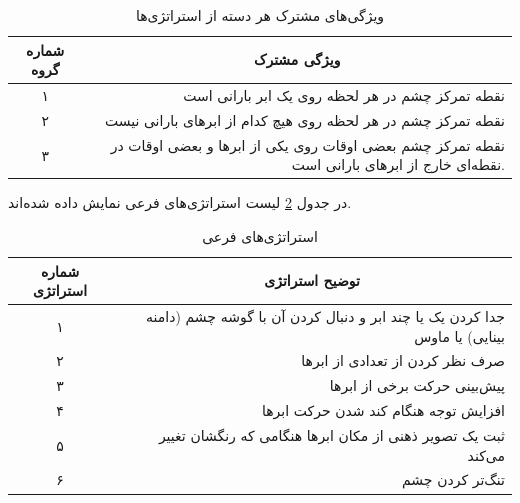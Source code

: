 \documentclass[twoside, a4paper,11pt]{book}
\numberwithin{equation}{chapter}
\numberwithin{table}{chapter}
\numberwithin{figure}{chapter}
\numberwithin{equation}{chapter}
\begin{document}
\begin{table}[]
\centering
\caption{ویژگی‌های مشترک هر دسته از استراتژی‌ها}
\label{mainStrategyGroups}
\begin{scriptsize}
\begin{center}
\begin{tabular}{|c|r|}
\hline
\textbf{شماره گروه} & \multicolumn{1}{c|}{\textbf{ویژگی مشترک}} \\ \hline
۱ & نقطه تمرکز چشم در هر لحظه روی یک ابر بارانی است \\ \hline
۲ & نقطه تمرکز چشم در هر لحظه روی هیچ کدام از ابرهای بارانی نیست \\ \hline
۳ & نقطه تمرکز چشم بعضی اوقات روی یکی از ابرها و بعضی اوقات در نقطه‌ای خارج از ابرهای بارانی است. \\ \hline
\end{tabular}
\end{center}
\end{scriptsize}
\end{table}
در جدول \ref{secondaryStrategies} لیست استراتژی‌های فرعی نمایش داده شده‌اند.

\begin{table}[]
\centering
\caption{استراتژی‌های فرعی}
\label{secondaryStrategies}
\begin{scriptsize}
\begin{center}
\begin{tabular}{|c|r|}
\hline
\textbf{شماره استراتژی} & \multicolumn{1}{c|}{\textbf{توضیح استراتژی}} \\ \hline
۱ & جدا کردن یک یا چند ابر و دنبال کردن آن با گوشه چشم (دامنه بینایی) یا ماوس \\ \hline
۲ & صرف نظر کردن از تعدادی از ابرها \\ \hline
۳ & پیش‌بینی حرکت برخی از ابرها \\ \hline
۴ & افزایش توجه هنگام کند شدن حرکت ابرها \\ \hline
۵ & ثبت یک تصویر ذهنی از مکان ابرها هنگامی که رنگشان تغییر می‌کند \\ \hline
۶ & تنگ‌تر کردن چشم \\ \hline
\end{tabular}
\end{center}
\end{scriptsize}
\end{table}
\end{document}
